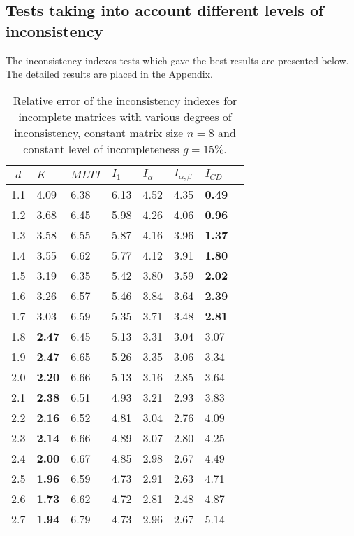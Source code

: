 \subsection{Tests taking into account different levels of inconsistency}
The inconsistency indexes tests which gave the best results are presented below. The detailed results are placed in the Appendix.
\begin{table}[!ht]
\begin{center}
\caption{Relative error of the inconsistency indexes for incomplete matrices with various degrees of inconsistency, constant matrix size $n=8$ and constant level of incompleteness $g=15\%$.}
\label{tab:results3}
\begin{tabular}{|c||lllll||l|c|}
\hline $d$ & $K$ & $MLTI$ & $I_1$ & $I_{\alpha}$ & $I_{\alpha,\beta}$ & $I_{CD}$  \\ \hline \hline
1.1 & 4.09 & 6.38 & 6.13 & 4.52 & 4.35 & \textbf{0.49} \\ \hline
1.2 & 3.68 & 6.45 & 5.98 & 4.26 & 4.06 & \textbf{0.96} \\ \hline
1.3 & 3.58 & 6.55 & 5.87 & 4.16 & 3.96 & \textbf{1.37} \\ \hline
1.4 & 3.55 & 6.62 & 5.77 & 4.12 & 3.91 & \textbf{1.80} \\ \hline
1.5 & 3.19 & 6.35 & 5.42 & 3.80 & 3.59 & \textbf{2.02} \\ \hline
1.6 & 3.26 & 6.57 & 5.46 & 3.84 & 3.64 & \textbf{2.39} \\ \hline
1.7 & 3.03 & 6.59 & 5.35 & 3.71 & 3.48 & \textbf{2.81} \\ \hline
1.8 & \textbf{2.47} & 6.45 & 5.13 & 3.31 & 3.04 & 3.07 \\ \hline
1.9 & \textbf{2.47} & 6.65 & 5.26 & 3.35 & 3.06 & 3.34 \\ \hline
2.0 & \textbf{2.20} & 6.66 & 5.13 & 3.16 & 2.85 & 3.64 \\ \hline
2.1 & \textbf{2.38} & 6.51 & 4.93 & 3.21 & 2.93 & 3.83 \\ \hline
2.2 & \textbf{2.16} & 6.52 & 4.81 & 3.04 & 2.76 & 4.09 \\ \hline
2.3 & \textbf{2.14} & 6.66 & 4.89 & 3.07 & 2.80 & 4.25 \\ \hline
2.4 & \textbf{2.00} & 6.67 & 4.85 & 2.98 & 2.67 & 4.49 \\ \hline
2.5 & \textbf{1.96} & 6.59 & 4.73 & 2.91 & 2.63 & 4.71 \\ \hline
2.6 & \textbf{1.73} & 6.62 & 4.72 & 2.81 & 2.48 & 4.87 \\ \hline
2.7 & \textbf{1.94} & 6.79 & 4.73 & 2.96 & 2.67 & 5.14 \\ \hline

\end{tabular}
\end{center}
\end{table}
